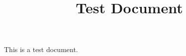 \documentclass{report}
\begin{document}
\title{Test Document}
\maketitle

This is a test document.
\end{document}
